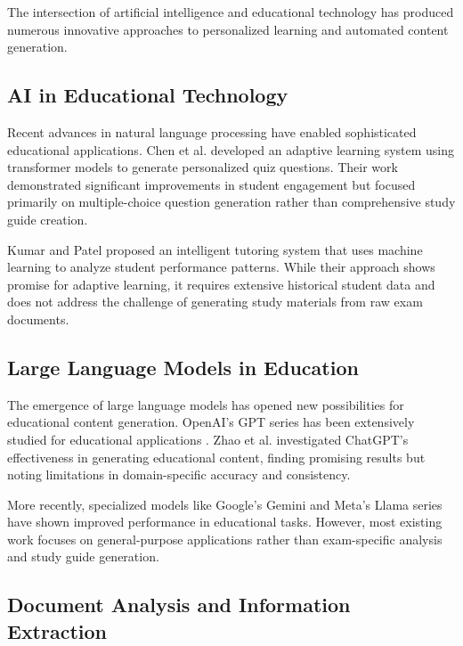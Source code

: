 \documentclass[conference]{IEEEtran}
\begin{document}
The intersection of artificial intelligence and educational technology has produced numerous innovative approaches to personalized learning and automated content generation.

\subsection{AI in Educational Technology}

Recent advances in natural language processing have enabled sophisticated educational applications. Chen et al. \cite{chen2023adaptive} developed an adaptive learning system using transformer models to generate personalized quiz questions. Their work demonstrated significant improvements in student engagement but focused primarily on multiple-choice question generation rather than comprehensive study guide creation.

Kumar and Patel \cite{kumar2022intelligent} proposed an intelligent tutoring system that uses machine learning to analyze student performance patterns. While their approach shows promise for adaptive learning, it requires extensive historical student data and does not address the challenge of generating study materials from raw exam documents.

\subsection{Large Language Models in Education}

The emergence of large language models has opened new possibilities for educational content generation. OpenAI's GPT series has been extensively studied for educational applications \cite{brown2020language}. Zhao et al. \cite{zhao2023chatgpt} investigated ChatGPT's effectiveness in generating educational content, finding promising results but noting limitations in domain-specific accuracy and consistency.

More recently, specialized models like Google's Gemini \cite{team2023gemini} and Meta's Llama series \cite{touvron2023llama} have shown improved performance in educational tasks. However, most existing work focuses on general-purpose applications rather than exam-specific analysis and study guide generation.

\subsection{Document Analysis and Information Extraction}
\end{document}
